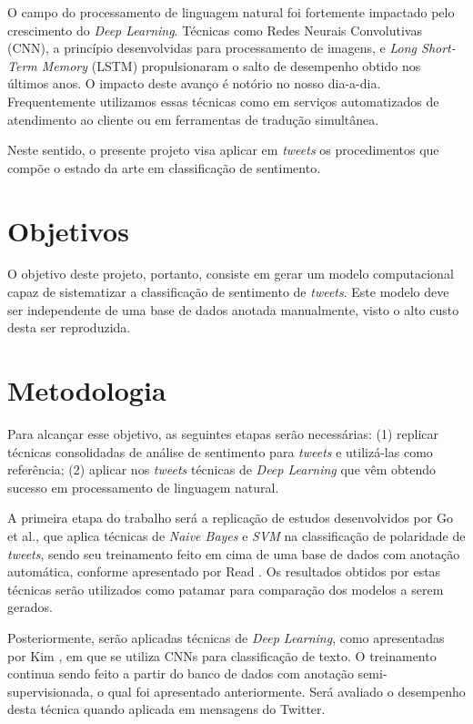 O campo do processamento de linguagem natural foi fortemente impactado pelo crescimento do \textit{Deep Learning}. Técnicas como Redes Neurais Convolutivas (CNN), a princípio desenvolvidas para processamento de imagens, e \textit{Long Short-Term Memory} (LSTM) propulsionaram o salto de desempenho obtido nos últimos anos. O impacto deste avanço é notório no nosso dia-a-dia. Frequentemente utilizamos essas técnicas como em serviços automatizados de atendimento ao cliente ou em ferramentas de tradução simultânea.

Neste sentido, o presente projeto visa aplicar em \textit{tweets} os procedimentos que compõe o estado da arte em classificação de sentimento.

\section{Objetivos}

O objetivo deste projeto, portanto, consiste em gerar um modelo computacional capaz de sistematizar a classificação de sentimento de \textit{tweets}. Este modelo deve ser independente de uma base de dados anotada manualmente, visto o alto custo desta ser reproduzida.

\section{Metodologia}

Para alcançar esse objetivo, as seguintes etapas serão necessárias: (1) replicar técnicas consolidadas de análise de sentimento para \textit{tweets} e utilizá-las como referência; (2) aplicar nos \textit{tweets} técnicas de \textit{Deep Learning} que vêm obtendo sucesso em processamento de linguagem natural.

A primeira etapa do trabalho será a replicação de estudos desenvolvidos por Go et al., \cite{go09} que aplica técnicas de \textit{Naive Bayes} e \textit{SVM} na classificação de polaridade de \textit{tweets}, sendo seu treinamento feito em cima de uma base de dados com anotação automática, conforme apresentado por Read \cite{read05}. Os resultados obtidos por estas técnicas serão utilizados como patamar para comparação dos modelos a serem gerados.

Posteriormente, serão aplicadas técnicas de \textit{Deep Learning}, como apresentadas por Kim \cite{kim14}, em que se utiliza CNNs para classificação de texto. O treinamento continua sendo feito a partir do banco de dados com anotação semi-supervisionada, o qual foi apresentado anteriormente. Será avaliado o desempenho desta técnica quando aplicada em mensagens do Twitter.

